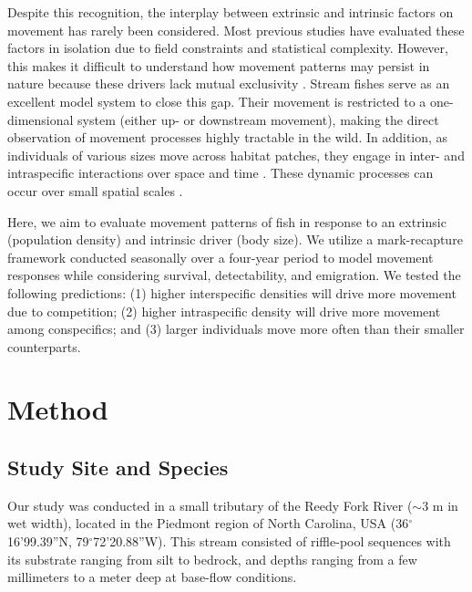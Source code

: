 \documentclass[11pt, class=article, crop=false]{standalone}
\begin{document}
Despite this recognition, the interplay between extrinsic and intrinsic factors on movement has rarely been considered. Most previous studies have evaluated these factors in isolation due to field constraints and statistical complexity. However, this makes it difficult to understand how movement patterns may persist in nature because these drivers lack mutual exclusivity \citep{mcmahonLinkingHabitatSelection2006}. Stream fishes serve as an excellent model system to close this gap. Their movement is restricted to a one-dimensional system (either up- or downstream movement), making the direct observation of movement processes highly tractable in the wild. In addition, as individuals of various sizes move across habitat patches, they engage in inter- and intraspecific interactions over space and time \citep{brownHabitatHeterogeneityActivity2010, davidsonSeasonalSpatialHydrological2012, robinsonEffectsMultiyearExperimental2003, albaneseEcologicalCorrelatesFish2004, nakayamaFinescaleMovementEcology2018, pettyRestrictedMovementMottled2004, robertsSpatiotemporalVariabilityStream2007}. These dynamic processes can occur over small spatial scales \citep{teruiNonrandomDispersalSympatric2021}. 

Here, we aim to evaluate movement patterns of fish in response to an extrinsic (population density) and intrinsic driver (body size). We utilize a mark-recapture framework conducted seasonally over a four-year period to model movement responses while considering survival, detectability, and emigration. We tested the following predictions: (1) higher interspecific densities will drive more movement due to competition; (2) higher intraspecific density will drive more movement among conspecifics; and (3) larger individuals move more often than their smaller counterparts.

\section{Method}

\subsection{Study Site and Species}

Our study was conducted in a small tributary of the Reedy Fork River ($\sim$3 m in wet width), located in the Piedmont region of North Carolina, USA (36$^\circ$16’99.39”N, 79$^\circ$72’20.88”W). This stream consisted of riffle-pool sequences with its substrate ranging from silt to bedrock, and depths ranging from a few millimeters to a meter deep at base-flow conditions. 
\end{document}
